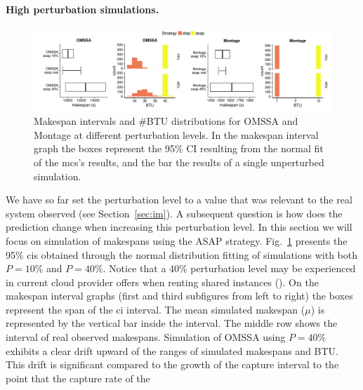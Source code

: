 \documentclass[]{llncs}
\begin{document}
\paragraph{High perturbation simulations.}\label{sec:sa}
\begin{figure}[bt]
	\includegraphics[width=\textwidth]{gfx/int_plot.pdf}
	\caption[caption]{Makespan intervals and \#BTU distributions for OMSSA and 
	Montage at different perturbation levels. In the makespan interval graph 
	the boxes represent the 95\% CI resulting from the normal fit of the
	\acs{mcs}'s results, and the bar the results of a single unperturbed 
	simulation.%
	}
	\label{fig:int}
\end{figure}
We have so  far set the perturbation level  to a value that was  relevant to the
real system observed  (see Section~\ref{sec:im}).  A subsequent  question is how
does the  prediction change  when increasing this  perturbation level.   In this
section  we will  focus  on simulation  of makespans  using  the ASAP  strategy.
Fig.~\ref{fig:int}  presents  the  95\%  \acp{ci} obtained  through  the  normal
distribution fitting of  simulations with both $P=10\%$ and $P=40\%$.  Notice that a
40\% perturbation level may be experienced in current cloud provider offers when
renting shared  instances (\cite{LeitnerC16}).  On the  makespan interval graphs
(first and third subfigures from left to  right) the boxes represent the span of
the \ac{ci}  interval. The mean  simulated makespan ($\mu{}$) is  represented by
the vertical bar inside the interval. The middle row shows the interval of real 
observed makespans.
%
Simulation of OMSSA using $P=40\%$ exhibits a clear drift upward of
the ranges of simulated makespans and BTU. This drift is significant compared to
the growth of the capture interval to the point that the capture rate of the
\end{document}
